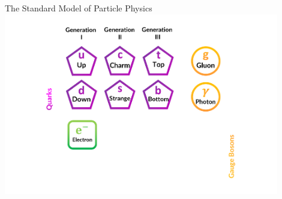 \begin{frame}{The Standard Model of Particle Physics}
    \includegraphics[width=0.9\textwidth]{Figures Introductory Lecture/Standard Model/ENG_SM2_1.png}
\end{frame}





